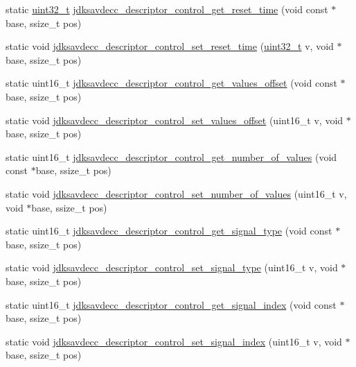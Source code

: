 \begin{DoxyCompactItemize}
\item 
static \hyperlink{parse_8c_a6eb1e68cc391dd753bc8ce896dbb8315}{uint32\+\_\+t} \hyperlink{group__descriptor__control_ga2b5a7307d31d9b5f707c88101aeedc62}{jdksavdecc\+\_\+descriptor\+\_\+control\+\_\+get\+\_\+reset\+\_\+time} (void const $\ast$base, ssize\+\_\+t pos)
\item 
static void \hyperlink{group__descriptor__control_gac0ea7b224c1c26c9d4f4e2315346a474}{jdksavdecc\+\_\+descriptor\+\_\+control\+\_\+set\+\_\+reset\+\_\+time} (\hyperlink{parse_8c_a6eb1e68cc391dd753bc8ce896dbb8315}{uint32\+\_\+t} v, void $\ast$base, ssize\+\_\+t pos)
\item 
static uint16\+\_\+t \hyperlink{group__descriptor__control_gaf173ce05404df247991fdcf4d8c91d6f}{jdksavdecc\+\_\+descriptor\+\_\+control\+\_\+get\+\_\+values\+\_\+offset} (void const $\ast$base, ssize\+\_\+t pos)
\item 
static void \hyperlink{group__descriptor__control_gae084def036aad40cee3174cbfea8b679}{jdksavdecc\+\_\+descriptor\+\_\+control\+\_\+set\+\_\+values\+\_\+offset} (uint16\+\_\+t v, void $\ast$base, ssize\+\_\+t pos)
\item 
static uint16\+\_\+t \hyperlink{group__descriptor__control_ga1e94b730b6e00d604c5d9745c1adfd2b}{jdksavdecc\+\_\+descriptor\+\_\+control\+\_\+get\+\_\+number\+\_\+of\+\_\+values} (void const $\ast$base, ssize\+\_\+t pos)
\item 
static void \hyperlink{group__descriptor__control_gae4c9466a2cf1565ab3de6358e6d9bfe9}{jdksavdecc\+\_\+descriptor\+\_\+control\+\_\+set\+\_\+number\+\_\+of\+\_\+values} (uint16\+\_\+t v, void $\ast$base, ssize\+\_\+t pos)
\item 
static uint16\+\_\+t \hyperlink{group__descriptor__control_gaee48af3d9860a1005188a96e5987d934}{jdksavdecc\+\_\+descriptor\+\_\+control\+\_\+get\+\_\+signal\+\_\+type} (void const $\ast$base, ssize\+\_\+t pos)
\item 
static void \hyperlink{group__descriptor__control_ga4150128b82314fbe39ed886ab7f0b8de}{jdksavdecc\+\_\+descriptor\+\_\+control\+\_\+set\+\_\+signal\+\_\+type} (uint16\+\_\+t v, void $\ast$base, ssize\+\_\+t pos)
\item 
static uint16\+\_\+t \hyperlink{group__descriptor__control_ga134e360ffd3c714e3ad9fc77bbc00700}{jdksavdecc\+\_\+descriptor\+\_\+control\+\_\+get\+\_\+signal\+\_\+index} (void const $\ast$base, ssize\+\_\+t pos)
\item 
static void \hyperlink{group__descriptor__control_gaf4e4b4de104f183a2b743cea1153569c}{jdksavdecc\+\_\+descriptor\+\_\+control\+\_\+set\+\_\+signal\+\_\+index} (uint16\+\_\+t v, void $\ast$base, ssize\+\_\+t pos)

\end{DoxyCompactItemize}
